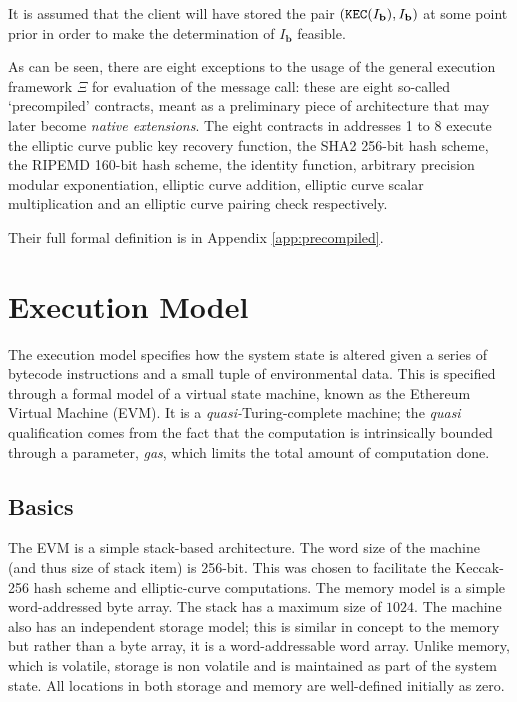 \documentclass[9pt,oneside]{amsart}
\begin{document}
\begin{multicols}{2}
It is assumed that the client will have stored the pair $(\mathtt{\tiny KEC}(I_{\mathbf{b}}), I_{\mathbf{b}})$ at some point prior in order to make the determination of $I_{\mathbf{b}}$ feasible.

As can be seen, there are eight exceptions to the usage of the general execution framework $\Xi$ for evaluation of the message call: these are eight so-called `precompiled' contracts, meant as a preliminary piece of architecture that may later become \textit{native extensions}. The eight contracts in addresses 1 to 8 execute the elliptic curve public key recovery function, the SHA2 256-bit hash scheme, the RIPEMD 160-bit hash scheme, the identity function, arbitrary precision modular exponentiation, elliptic curve addition, elliptic curve scalar multiplication and an elliptic curve pairing check respectively.

Their full formal definition is in Appendix \ref{app:precompiled}.

\section{Execution Model} \label{ch:model}

The execution model specifies how the system state is altered given a series of bytecode instructions and a small tuple of environmental data. This is specified through a formal model of a virtual state machine, known as the Ethereum Virtual Machine (EVM). It is a \textit{quasi-}Turing-complete machine; the \textit{quasi} qualification comes from the fact that the computation is intrinsically bounded through a parameter, \textit{gas}, which limits the total amount of computation done.

\subsection{Basics}

The EVM is a simple stack-based architecture. The word size of the machine (and thus size of stack item) is 256-bit. This was chosen to facilitate the Keccak-256 hash scheme and elliptic-curve computations. The memory model is a simple word-addressed byte array. The stack has a maximum size of $1024$. The machine also has an independent storage model; this is similar in concept to the memory but rather than a byte array, it is a word-addressable word array. Unlike memory, which is volatile, storage is non volatile and is maintained as part of the system state. All locations in both storage and memory are well-defined initially as zero.


\end{multicols}
\end{document}
